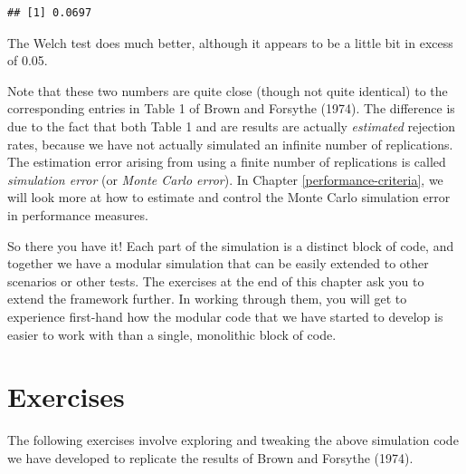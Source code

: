 \documentclass[
]{book}
\begin{document}
\begin{verbatim}
## [1] 0.0697
\end{verbatim}

The Welch test does much better, although it appears to be a little bit in excess of 0.05.

Note that these two numbers are quite close (though not quite identical) to the corresponding entries in Table 1 of Brown and Forsythe (1974). The difference is due to the fact that both Table 1 and are results are actually \emph{estimated} rejection rates, because we have not actually simulated an infinite number of replications. The estimation error arising from using a finite number of replications is called \emph{simulation error} (or \emph{Monte Carlo error}).
In Chapter \ref{performance-criteria}, we will look more at how to estimate and control the Monte Carlo simulation error in performance measures.

So there you have it! Each part of the simulation is a distinct block of code, and together we have a modular simulation that can be easily extended to other scenarios or other tests.
The exercises at the end of this chapter ask you to extend the framework further.
In working through them, you will get to experience first-hand how the modular code that we have started to develop is easier to work with than a single, monolithic block of code.

\section{Exercises}\label{exAnovaExercises}

The following exercises involve exploring and tweaking the above simulation code we have developed to replicate the results of Brown and Forsythe (1974).
\end{document}
